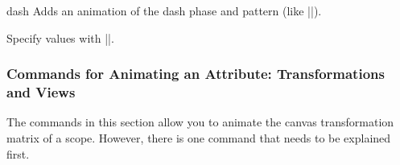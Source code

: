 \begin{sysanimateattribute}{dash}
  Adds an animation of the dash phase and pattern (like |\pgfsys@setdash|).
  
  Specify values with |\pgfsys@animation@val@dash|.
\begin{codeexample}[width=2cm]
\end{codeexample}
\begin{codeexample}[width=2cm]
\end{codeexample}
\begin{codeexample}[width=2cm]
\end{codeexample}
\end{sysanimateattribute}



\subsubsection{Commands for Animating an Attribute: Transformations  and Views}

The commands in this section allow you to animate the canvas
transformation matrix of a scope. However, there is one command that
needs to be explained first.

